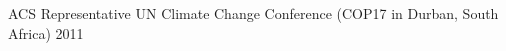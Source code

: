 \begin{cvhonors}





\cvhonor
{ACS Representative} %
{UN Climate Change Conference (COP17 in Durban, South Africa)} %
{} %
{2011} %


\end{cvhonors}
